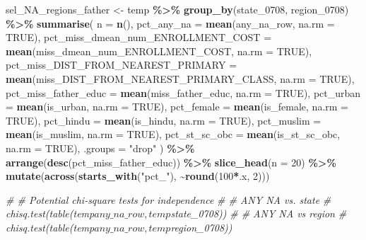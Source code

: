 \documentclass[
]{article}
\newenvironment{Shaded}{\begin{snugshade}}{\end{snugshade}}
\newcommand{\AttributeTok}[1]{\textcolor[rgb]{0.13,0.29,0.53}{#1}}
\newcommand{\CommentTok}[1]{\textcolor[rgb]{0.56,0.35,0.01}{\textit{#1}}}
\newcommand{\ConstantTok}[1]{\textcolor[rgb]{0.56,0.35,0.01}{#1}}
\newcommand{\DecValTok}[1]{\textcolor[rgb]{0.00,0.00,0.81}{#1}}
\newcommand{\FunctionTok}[1]{\textcolor[rgb]{0.13,0.29,0.53}{\textbf{#1}}}
\newcommand{\NormalTok}[1]{#1}
\newcommand{\OtherTok}[1]{\textcolor[rgb]{0.56,0.35,0.01}{#1}}
\newcommand{\SpecialCharTok}[1]{\textcolor[rgb]{0.81,0.36,0.00}{\textbf{#1}}}
\newcommand{\StringTok}[1]{\textcolor[rgb]{0.31,0.60,0.02}{#1}}
\begin{document}
\begin{Shaded}
\begin{Highlighting}[]
\NormalTok{sel\_NA\_regions\_father }\OtherTok{\textless{}{-}}\NormalTok{ temp }\SpecialCharTok{\%\textgreater{}\%} 
  \FunctionTok{group\_by}\NormalTok{(state\_0708, region\_0708) }\SpecialCharTok{\%\textgreater{}\%}
  \FunctionTok{summarise}\NormalTok{(}
    \AttributeTok{n =} \FunctionTok{n}\NormalTok{(),}
    \AttributeTok{pct\_any\_na =} \FunctionTok{mean}\NormalTok{(any\_na\_row, }\AttributeTok{na.rm =} \ConstantTok{TRUE}\NormalTok{),}
    \AttributeTok{pct\_miss\_dmean\_num\_ENROLLMENT\_COST =} \FunctionTok{mean}\NormalTok{(miss\_dmean\_num\_ENROLLMENT\_COST, }\AttributeTok{na.rm =} \ConstantTok{TRUE}\NormalTok{),}
    \AttributeTok{pct\_miss\_DIST\_FROM\_NEAREST\_PRIMARY =} \FunctionTok{mean}\NormalTok{(miss\_DIST\_FROM\_NEAREST\_PRIMARY\_CLASS, }\AttributeTok{na.rm =} \ConstantTok{TRUE}\NormalTok{),}
    \AttributeTok{pct\_miss\_father\_educ =} \FunctionTok{mean}\NormalTok{(miss\_father\_educ, }\AttributeTok{na.rm =} \ConstantTok{TRUE}\NormalTok{),}
    \AttributeTok{pct\_urban =} \FunctionTok{mean}\NormalTok{(is\_urban, }\AttributeTok{na.rm =} \ConstantTok{TRUE}\NormalTok{),}
    \AttributeTok{pct\_female =} \FunctionTok{mean}\NormalTok{(is\_female, }\AttributeTok{na.rm =} \ConstantTok{TRUE}\NormalTok{),}
    \AttributeTok{pct\_hindu =} \FunctionTok{mean}\NormalTok{(is\_hindu, }\AttributeTok{na.rm =} \ConstantTok{TRUE}\NormalTok{),}
    \AttributeTok{pct\_muslim =} \FunctionTok{mean}\NormalTok{(is\_muslim, }\AttributeTok{na.rm =} \ConstantTok{TRUE}\NormalTok{),}
    \AttributeTok{pct\_st\_sc\_obc =} \FunctionTok{mean}\NormalTok{(is\_st\_sc\_obc, }\AttributeTok{na.rm =} \ConstantTok{TRUE}\NormalTok{),}
    \AttributeTok{.groups =} \StringTok{"drop"}
\NormalTok{  ) }\SpecialCharTok{\%\textgreater{}\%}
  \FunctionTok{arrange}\NormalTok{(}\FunctionTok{desc}\NormalTok{(pct\_miss\_father\_educ)) }\SpecialCharTok{\%\textgreater{}\%}
  \FunctionTok{slice\_head}\NormalTok{(}\AttributeTok{n =} \DecValTok{20}\NormalTok{) }\SpecialCharTok{\%\textgreater{}\%}
  \FunctionTok{mutate}\NormalTok{(}\FunctionTok{across}\NormalTok{(}\FunctionTok{starts\_with}\NormalTok{(}\StringTok{"pct\_"}\NormalTok{), }\SpecialCharTok{\textasciitilde{}}\FunctionTok{round}\NormalTok{(}\DecValTok{100}\SpecialCharTok{*}\NormalTok{.x, }\DecValTok{2}\NormalTok{)))}

\CommentTok{\# \# Potential chi{-}square tests for independence}
\CommentTok{\# \# ANY NA vs. state}
\CommentTok{\# chisq.test(table(temp$any\_na\_row, temp$state\_0708))}
\CommentTok{\# \# ANY NA vs region}
\CommentTok{\# chisq.test(table(temp$any\_na\_row, temp$region\_0708))}






\end{Highlighting}
\end{Shaded}
\end{document}
